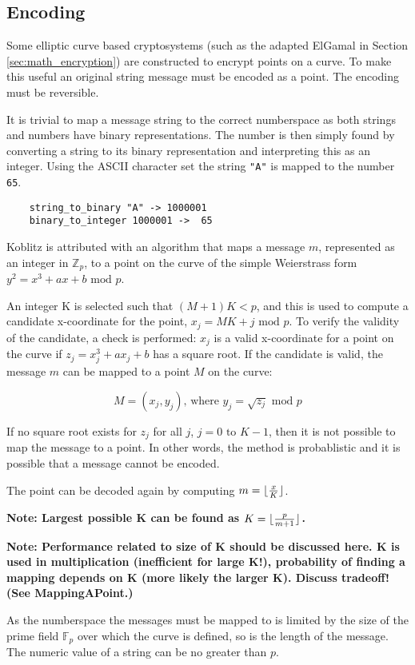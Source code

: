 \subsection{Encoding}
\label{sec:math_encoding}

Some elliptic curve based cryptosystems (such as the adapted ElGamal in Section \ref{sec:math_encryption}) are constructed to encrypt points on a curve. To make
this useful an original string message must be encoded as a point. The encoding must be reversible.

It is trivial to map a message string to the correct numberspace as both strings and numbers have binary representations. The number is then
simply found by converting a string to its binary representation and interpreting this as an integer. Using the ASCII character set the string
\verb+"A"+ is mapped to the number \verb+65+.

\begin{verbatim}
    string_to_binary "A" -> 1000001
    binary_to_integer 1000001 ->  65
\end{verbatim}

Koblitz is attributed with an algorithm that maps a message \(m\), represented as an integer in \(\mathbb{Z}_p\), to a point on the curve of the
simple Weierstrass form \(y^2 = x^3 + ax + b \text{ mod } p\).\cite{MappingAMessage}

An integer K is selected such that \((M + 1)K < p\), and this is used to compute
a candidate x-coordinate for the point, \(x_j = MK + j \text{ mod } p\). To verify the validity of the candidate, a check is performed: \(x_j\)
is a valid x-coordinate for a point on the curve if \(z_j = x_j^3 + ax_j + b\) has a square root. If the candidate is valid, the message \(m\)
can be mapped to a point \(M\) on the curve:

\begin{equation}
	M = (x_j, y_j) \text{, where } y_j = \sqrt{z_j} \text{ mod } p
\end{equation}

If no square root exists for \(z_j\) for all \(j\), \(j = 0 \text{ to } K-1\), then it is not possible to map the message to a point. In other
words, the method is probablistic and it is possible that a message cannot be encoded.\cite{MappingAMessage}

The point can be decoded again by computing \(m = {\lfloor {{x} \over {K}} \rfloor}\).

\textbf{Note: Largest possible K can be found as \(K = \lfloor {{p} \over {m + 1}} \rfloor\).}

\textbf{Note: Performance related to size of K should be discussed here. K is used in multiplication (inefficient for large K!), probability of finding
a mapping depends on K (more likely the larger K). Discuss tradeoff! (See MappingAPoint.)}

As the numberspace the messages must be mapped to is limited by the size of the prime field \(\mathbb{F}_p\) over which the curve is defined, so is the
length of the message. The numeric value of a string can be no greater than \(p\).